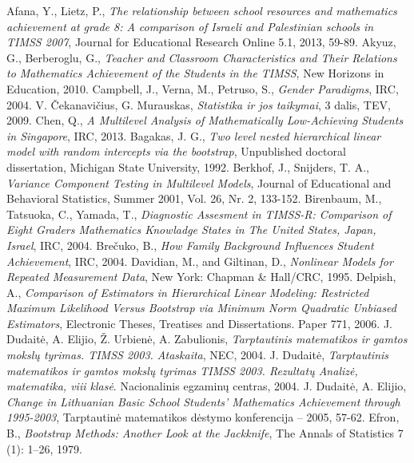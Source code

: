 \documentclass[12pt,a4paper]{article}
\begin{document}
\newpage
{}
\begin{thebibliography}{1}
 Afana, Y., Lietz, P., \textit{The relationship between school resources and mathematics achievement at grade 8: A comparison of Israeli and Palestinian schools in TIMSS 2007}, Journal for Educational Research Online 5.1, 2013, 59-89.
 Akyuz, G., Berberoglu, G., \textit{Teacher and Classroom Characteristics and Their Relations to Mathematics Achievement of the Students in the TIMSS}, New Horizons in Education, 2010.
 Campbell, J., Verna, M., Petruso, S., \textit{Gender Paradigms}, IRC, 2004.
 V. Čekanavičius, G. Murauskas, \textit{Statistika ir jos taikymai}, 3 dalis, TEV, 2009.
 Chen, Q., \textit{A Multilevel Analysis of Mathematically Low-Achieving Students in Singapore}, IRC, 2013.
 Bagakas, J. G., \textit{Two level nested hierarchical linear model with random intercepts via the bootstrap}, Unpublished doctoral dissertation, Michigan State University, 1992.
 Berkhof, J., Snijders, T. A., \textit{Variance Component Testing in Multilevel Models}, Journal of Educational and Behavioral Statistics, Summer 2001, Vol. 26, Nr. 2, 133-152.
 Birenbaum, M., Tatsuoka, C., Yamada, T., \textit{Diagnostic Assesment in TIMSS-R: Comparison of Eight Graders Mathematics Knowladge States in The United States, Japan, Israel}, IRC, 2004.
 Brečuko, B., \textit{How Family Background Influences Student Achievement}, IRC, 2004.
 Davidian, M., and Giltinan, D., \textit{Nonlinear Models for Repeated Measurement Data}, New York: Chapman \& Hall/CRC, 1995.
 Delpish, A., \textit{Comparison of Estimators in Hierarchical Linear Modeling: Restricted Maximum Likelihood Versus Bootstrap via Minimum Norm Quadratic Unbiased Estimators}, Electronic Theses, Treatises and Dissertations. Paper 771, 2006.
 J. Dudaitė, A. Elijio, Ž. Urbienė, A. Zabulionis, \textit{Tarptautinis matematikos ir gamtos mokslų tyrimas. TIMSS 2003. Ataskaita}, NEC, 2004.
 J. Dudaitė, \textit{Tarptautinis matematikos ir gamtos mokslų tyrimas TIMSS 2003. Rezultatų Analizė, matematika, viii klasė}. Nacionalinis egzaminų centras, 2004.
 J. Dudaitė, A. Elijio, \textit{Change in Lithuanian Basic School Students’ Mathematics Achievement through 1995-2003}, Tarptautinė matematikos dėstymo konferencija – 2005, 57-62.
 Efron, B., \textit{Bootstrap Methods: Another Look at the Jackknife}, The Annals of Statistics 7 (1): 1–26, 1979.

\end{thebibliography}
\end{document}
